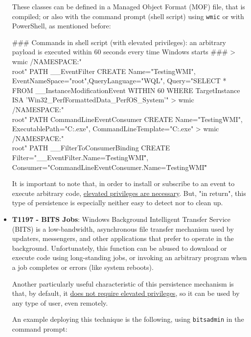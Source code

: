 \begin{itemize}
These classes can be defined in a Managed Object Format (MOF) file, that is compiled; or also with the command prompt (shell script) using \texttt{wmic} or with PowerShell, as mentioned before: 
\vspace{7pt}
\begin{spverbatim}
### Commands in shell script (with elevated privileges): an arbitrary payload is executed within 60 seconds every time Windows starts ###
> wmic /NAMESPACE:"\\root\subscription" PATH __EventFilter CREATE Name="TestingWMI", EventNameSpace="root",QueryLanguage="WQL", Query="SELECT * FROM __InstanceModificationEvent WITHIN 60 WHERE TargetInstance ISA 'Win32_PerfFormattedData_PerfOS_System'"
> wmic /NAMESPACE:"\\root\subscription" PATH CommandLineEventConsumer CREATE Name="TestingWMI", ExecutablePath="C:\Windows{}\malware.exe", CommandLineTemplate="C:\Windows{}\malware.exe"
> wmic /NAMESPACE:"\\root\subscription" PATH __FilterToConsumerBinding CREATE Filter="__EventFilter.Name=\"TestingWMI\"", Consumer="CommandLineEventConsumer.Name=\"TestingWMI\""
\end{spverbatim}
\vspace{7pt}

It is important to note that, in order to install or subscribe to an event to execute arbitrary code, \underline{elevated privileges are necessary}. But, "in return", this type of persistence is especially neither easy to detect nor to clean up.

\item \textbf{T1197 - BITS Jobs}: Windows Background Intelligent Transfer Service (BITS) is a low-bandwidth, asynchronous file transfer mechanism used by updaters, messengers, and other applications that prefer to operate in the background. Unfortunately, this function can be abused to download or execute code using long-standing jobs, or invoking an arbitrary program when a job completes or errors (like system reboots).

Another particularly useful characteristic of this persistence mechanism is that, by default, it \underline{does not require elevated privileges}, so it can be used by any type of user, even remotely.

An example deploying this technique is the following, using \texttt{bitsadmin} in the command prompt:

\vspace{7pt}


\end{itemize}
